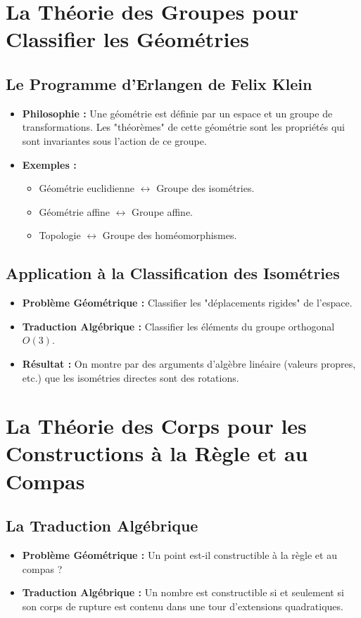 \documentclass[12pt, a4paper, parskip=full]{report}
\theoremstyle{agregstyle}
\begin{document}
\section{La Théorie des Groupes pour Classifier les Géométries}
\subsection{Le Programme d'Erlangen de Felix Klein}
\begin{itemize}
    \item \textbf{Philosophie :} Une géométrie est définie par un espace et un groupe de transformations. Les "théorèmes" de cette géométrie sont les propriétés qui sont invariantes sous l'action de ce groupe.
    \item \textbf{Exemples :}
        \begin{itemize}
            \item Géométrie euclidienne $\leftrightarrow$ Groupe des isométries.
            \item Géométrie affine $\leftrightarrow$ Groupe affine.
            \item Topologie $\leftrightarrow$ Groupe des homéomorphismes.
        \end{itemize}
\end{itemize}
\subsection{Application à la Classification des Isométries}
\begin{itemize}
    \item \textbf{Problème Géométrique :} Classifier les "déplacements rigides" de l'espace.
    \item \textbf{Traduction Algébrique :} Classifier les éléments du groupe orthogonal $O(3)$.
    \item \textbf{Résultat :} On montre par des arguments d'algèbre linéaire (valeurs propres, etc.) que les isométries directes sont des rotations.
\end{itemize}

\section{La Théorie des Corps pour les Constructions à la Règle et au Compas}
\subsection{La Traduction Algébrique}
\begin{itemize}
    \item \textbf{Problème Géométrique :} Un point est-il constructible à la règle et au compas ?
    \item \textbf{Traduction Algébrique :} Un nombre est constructible si et seulement si son corps de rupture est contenu dans une tour d'extensions quadratiques.
\end{itemize}
\end{document}
